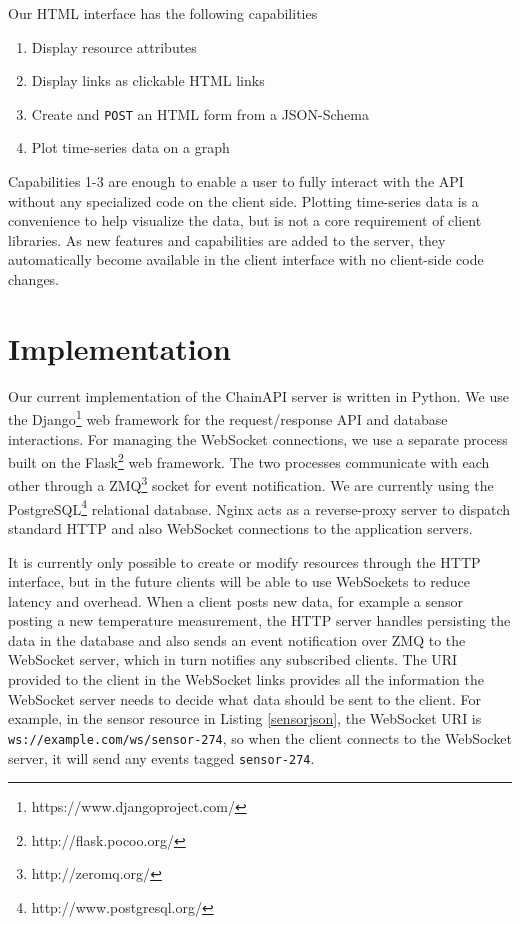 \documentclass{acm_proc_article-sp}
\newenvironment{tightenumerate}{
    \vspace{-10pt}
    \begin{enumerate}
        \setlength{\parskip}{-1pt}}{
    \end{enumerate}
    \vspace{-10pt}}
\begin{document}
Our HTML interface has the following capabilities

\begin{tightenumerate}
    \item Display resource attributes
    \item Display links as clickable HTML links
    \item Create and \texttt{POST} an HTML form from a JSON-Schema
    \item Plot time-series data on a graph
\end{tightenumerate}

Capabilities 1-3 are enough to enable a user to fully interact with the API
without any specialized code on the client side. Plotting time-series data is a
convenience to help visualize the data, but is not a core requirement of client
libraries. As new features and capabilities are added to the server, they
automatically become available in the client interface with no client-side code
changes.

\section{Implementation}

Our current implementation of the ChainAPI server is written in Python. We use
the Django\footnote{https://www.djangoproject.com/} web framework for the
request/response API and database interactions. For managing the WebSocket
connections, we use a separate process built on the
Flask\footnote{http://flask.pocoo.org/} web framework. The two processes
communicate with each other through a ZMQ\footnote{http://zeromq.org/} socket
for event notification. We are currently using the
PostgreSQL\footnote{http://www.postgresql.org/} relational database. Nginx acts
as a reverse-proxy server to dispatch standard HTTP and also WebSocket
connections to the application servers.

It is currently only possible to create or modify resources through the HTTP
interface, but in the future clients will be able to use WebSockets to reduce
latency and overhead. When a client posts new data, for example a sensor
posting a new temperature measurement, the HTTP server handles persisting the
data in the database and also sends an event notification over ZMQ to the
WebSocket server, which in turn notifies any subscribed clients. The URI
provided to the client in the WebSocket links provides all the information the
WebSocket server needs to decide what data should be sent to the client. For
example, in the sensor resource in Listing \ref{sensorjson}, the WebSocket URI
is \texttt{ws://example.com/ws/sensor-274}, so when the client connects to the
WebSocket server, it will send any events tagged \texttt{sensor-274}.
\end{document}
